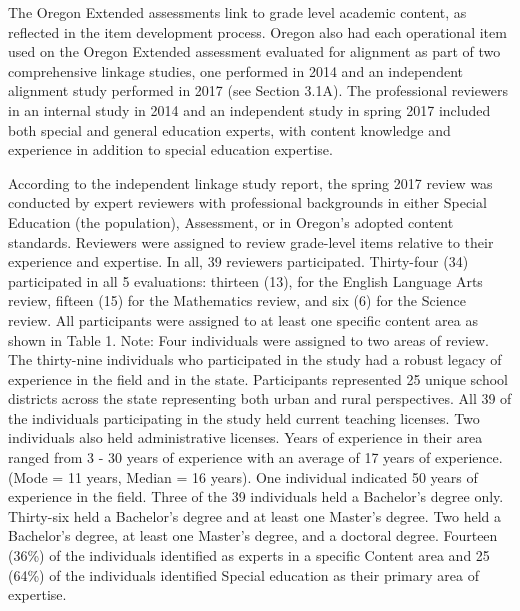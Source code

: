 \documentclass[]{article}
\begin{document}
The Oregon Extended assessments link to grade level academic content, as
reflected in the item development process. Oregon also had each
operational item used on the Oregon Extended assessment evaluated for
alignment as part of two comprehensive linkage studies, one performed in
2014 and an independent alignment study performed in 2017 (see Section
3.1A). The professional reviewers in an internal study in 2014 and an
independent study in spring 2017 included both special and general
education experts, with content knowledge and experience in addition to
special education expertise.

According to the independent linkage study report, the spring 2017
review was conducted by expert reviewers with professional backgrounds
in either Special Education (the population), Assessment, or in Oregon's
adopted content standards. Reviewers were assigned to review grade-level
items relative to their experience and expertise. In all, 39 reviewers
participated. Thirty-four (34) participated in all 5 evaluations:
thirteen (13), for the English Language Arts review, fifteen (15) for
the Mathematics review, and six (6) for the Science review. All
participants were assigned to at least one specific content area as
shown in Table 1. Note: Four individuals were assigned to two areas of
review. The thirty-nine individuals who participated in the study had a
robust legacy of experience in the field and in the state. Participants
represented 25 unique school districts across the state representing
both urban and rural perspectives. All 39 of the individuals
participating in the study held current teaching licenses. Two
individuals also held administrative licenses. Years of experience in
their area ranged from 3 - 30 years of experience with an average of 17
years of experience. (Mode = 11 years, Median = 16 years). One
individual indicated 50 years of experience in the field. Three of the
39 individuals held a Bachelor's degree only. Thirty-six held a
Bachelor's degree and at least one Master's degree. Two held a
Bachelor's degree, at least one Master's degree, and a doctoral degree.
Fourteen (36\%) of the individuals identified as experts in a specific
Content area and 25 (64\%) of the individuals identified Special
education as their primary area of expertise.
\end{document}
